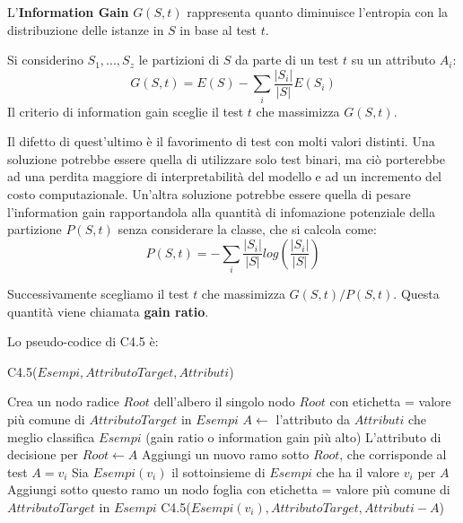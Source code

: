L'\textbf{Information Gain} $G(S,t)$ rappresenta quanto diminuisce l'entropia con la distribuzione delle istanze in $S$ in base al test $t$.

Si considerino $S_1, ..., S_z$ le partizioni di $S$ da parte di un test $t$ su un attributo $A_i$:
$$ G(S,t) = E(S) - \sum_{i} \frac{|S_i|}{|S|}E(S_i) $$
Il criterio di information gain sceglie il test $t$ che massimizza $G(S,t)$.

Il difetto di quest'ultimo è il favorimento di test con molti valori distinti. Una soluzione potrebbe essere quella di utilizzare solo test binari, ma ciò porterebbe ad una perdita maggiore di interpretabilità del modello e ad un incremento del costo computazionale. Un'altra soluzione potrebbe essere quella di pesare l'information gain rapportandola alla quantità di infomazione potenziale della partizione $P(S,t)$ senza considerare la classe, che si calcola come:
$$ P(S,t) = -\sum_{i} \frac{|S_i|}{|S|}log(\frac{|S_i|}{|S|}) $$

Successivamente scegliamo il test $t$ che massimizza $G(S,t)/P(S,t)$. Questa quantità viene chiamata \textbf{gain ratio}.

Lo pseudo-codice di C4.5 è:
\begin{algorithm}[!htb]
	\caption{C4.5($Esempi, AttributoTarget, Attributi$)}
	\begin{algorithmic}[1]
		\State Crea un nodo radice $Root$ dell'albero
			\State \Return il singolo nodo $Root$ con etichetta = valore più comune di
			\State$AttributoTarget$ in $Esempi$
		\Else
			\State $A \gets$ l'attributo da $Attributi$ che meglio classifica $Esempi$ (gain ratio
			\State o information gain più alto)
			\State L'attributo di decisione per $Root \gets A$
				\State Aggiungi un nuovo ramo sotto $Root$, che corrisponde al test $A=v_i$
				\State Sia $Esempi(v_i)$ il sottoinsieme di $Esempi$ che ha il valore $v_i$ per
				\State $A$
					\State Aggiungi sotto questo ramo un nodo foglia con etichetta =
					\State valore più comune di $AttributoTarget$ in $Esempi$
				\Else
					\State C4.5($Esempi(v_i), AttributoTarget, Attributi - {A}$)
				\EndIf
			\EndFor
		\EndIf
	\end{algorithmic}
\end{algorithm}

\pagebreak

